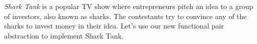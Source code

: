 \emph{Shark Tank} is a popular TV show where entrepreneurs pitch an idea to a group of investors,
also known as sharks. 
The contestants try to convince any of the sharks to invest money in their idea.
Let's use our new functional pair abstraction to implement Shark Tank.
